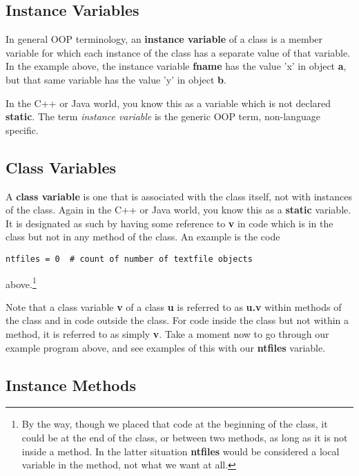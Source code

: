\subsection{Instance Variables}

In general OOP terminology, an {\bf instance variable} of a class is a
member variable for which each instance of the class has a separate
value of that variable.  In the example above, the instance variable
{\bf fname} has the value 'x' in object {\bf a}, but that same variable
has the value 'y' in object {\bf b}.

In the C++ or Java world, you know this as a variable which is not
declared {\bf static}.  The term {\it instance variable} is the generic
OOP term, non-language specific.   

\subsection{Class Variables}

A {\bf class variable} is one that is associated with the class itself,
not with instances of the class.  Again in the C++ or Java world, you
know this as a {\bf static} variable.  It is designated as such by
having some reference to {\bf v} in code which is in the class but not
in any method of the class.  An example is the code

\begin{Verbatim}[fontsize=\relsize{-2}]
ntfiles = 0  # count of number of textfile objects 
\end{Verbatim}

above.\footnote{By the way, though we placed that code at the beginning of the
class, it could be at the end of the class, or between two methods, as
long as it is not inside a method.  In the latter situation {\bf ntfiles}
would be considered a local variable in the method, not what we want at
all.}  

Note that a class variable {\bf v} of a class {\bf u} is referred to as
{\bf u.v} within methods of the class and in code outside the class.
For code inside the class but not within a method, it is referred to as
simply {\bf v}.  Take a moment now to go through our example program
above, and see examples of this with our {\bf ntfiles} variable.

\subsection{Instance Methods}

